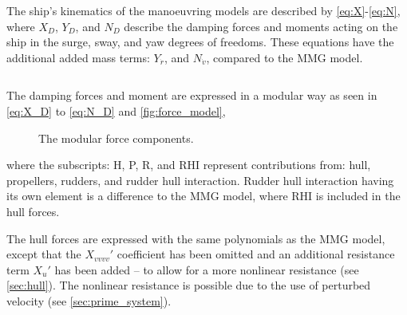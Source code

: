 The ship's kinematics of the manoeuvring models are described by \autoref{eq:X}-\autoref{eq:N}, where $X_D$, $Y_D$, and $N_D$ describe the damping forces and moments acting on the ship in the surge, sway, and yaw degrees of freedoms. These equations have the additional added mass terms: $Y_{\dot{r}}$, and $N_{\dot{v}}$, compared to the MMG model.

\begin{equation}
    \label{eq:X}
    
\end{equation}
%
\begin{equation}
    \label{eq:Y}
    
\end{equation}
%
\begin{equation}
    \label{eq:N}
    
\end{equation}

The damping forces and moment are expressed in a modular way as seen in \autoref{eq:X_D} to \autoref{eq:N_D} and \autoref{fig:force_model},
\begin{equation}
    \label{eq:X_D}
    
\end{equation}
%
\begin{equation}
    \label{eq:Y_D}
    
\end{equation}
%
\begin{equation}
    \label{eq:N_D}
    
\end{equation}
%
\begin{figure}[h]
    \centering
    
    \caption{The modular force components.}
    \label{fig:force_model}
\end{figure}
%
where the subscripts: H, P, R, and RHI represent contributions from: hull, propellers, rudders, and rudder hull interaction. Rudder hull interaction having its own element is a difference to the MMG model, where RHI is included in the hull forces.

The hull forces are expressed with the same polynomials as the MMG model, except that the ${X_{vvvv}}'$ coefficient has been omitted and an additional resistance term ${X_u}'$ has been added -- to allow for a more nonlinear resistance (see \autoref{sec:hull}). The nonlinear resistance is possible due to the use of perturbed velocity (see \autoref{sec:prime_system}).


